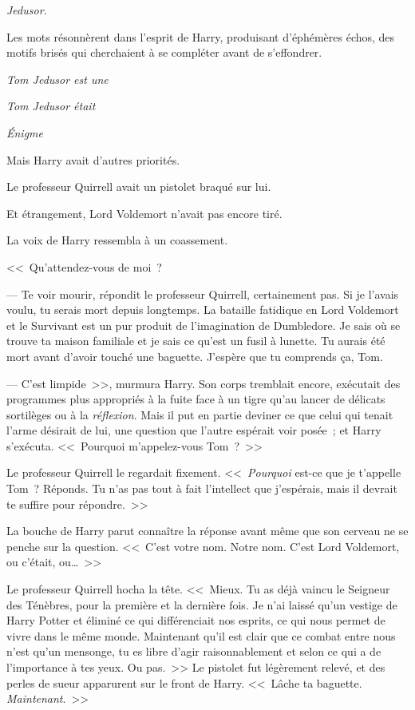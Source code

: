 
 \emph{Jedusor.}

\hplettrineextrapara
Les mots résonnèrent dans l'esprit de Harry, produisant d'éphémères échos, des motifs brisés qui cherchaient à se compléter avant de s'effondrer.

\emph{Tom Jedusor est une}

\emph{Tom Jedusor était}

\emph{Énigme}

Mais Harry avait d'autres priorités.

Le professeur Quirrell avait un pistolet braqué sur lui.

Et étrangement, Lord Voldemort n'avait pas encore tiré.

La voix de Harry ressembla à un coassement. 

<<~Qu'attendez-vous de moi~?

--- Te voir mourir, répondit le professeur Quirrell, certainement pas. Si je l'avais voulu, tu serais mort depuis longtemps. La bataille fatidique en Lord Voldemort et le Survivant est un pur produit de l'imagination de Dumbledore. Je sais où se trouve ta maison familiale et je sais ce qu'est un fusil à lunette. Tu aurais été mort avant d'avoir touché une baguette. J'espère que tu comprends ça, Tom.

--- C'est limpide~>>, murmura Harry. Son corps tremblait encore, exécutait des programmes plus appropriés à la fuite face à un tigre qu'au lancer de délicats sortilèges ou à la \emph{réflexion}. Mais il put en partie deviner ce que celui qui tenait l'arme désirait de lui, une question que l'autre espérait voir posée~; et Harry s'exécuta. <<~Pourquoi m'appelez-vous Tom~?~>>

Le professeur Quirrell le regardait fixement. <<~\emph{Pourquoi} est-ce que je t'appelle Tom~? Réponds. Tu n'as pas tout à fait l'intellect que j'espérais, mais il devrait te suffire pour répondre.~>>

La bouche de Harry parut connaître la réponse avant même que son cerveau ne se penche sur la question. <<~C'est votre nom. Notre nom. C'est Lord Voldemort, ou c'était, ou…~>>

Le professeur Quirrell hocha la tête. <<~Mieux. Tu as déjà vaincu le Seigneur des Ténèbres, pour la première et la dernière fois. Je n'ai laissé qu'un vestige de Harry Potter et éliminé ce qui différenciait nos esprits, ce qui nous permet de vivre dans le même monde. Maintenant qu'il est clair que ce combat entre nous n'est qu'un mensonge, tu es libre d'agir raisonnablement et selon ce qui a de l'importance à tes yeux. Ou pas.~>> Le pistolet fut légèrement relevé, et des perles de sueur apparurent sur le front de Harry. <<~Lâche ta baguette. \emph{Maintenant}.~>>

